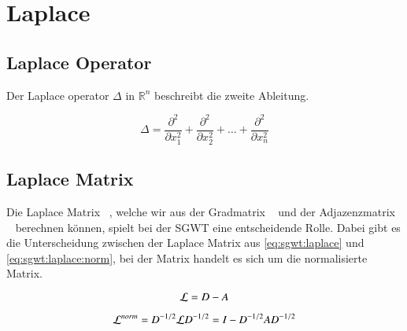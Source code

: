 
\section{Laplace\label{sec:sgwt:laplace}}

\subsection{Laplace Operator\label{subsec:sgwt:laplaceop}}

Der Laplace operator $\Delta$ in $\mathbb{R}^n$ beschreibt die zweite Ableitung.

\begin{equation}
\Delta = \frac{\partial^2}{\partial x_1^2}
+ \frac{\partial^2}{\partial x_2^2}
+ \dots
+ \frac{\partial^2}{\partial x_n^2}
\end{equation}

\subsection{Laplace Matrix\label{subsec:sgwt:laplacm}}


Die Laplace Matrix 
\laplaceL~\cite{noauthor_laplace-matrix_2017}, welche wir aus der 
Gradmatrix \degreeM~\cite{noauthor_degree_2018} und der Adjazenzmatrix 
\adjacencyM~\cite{noauthor_adjacency_2019} berechnen k\"onnen, spielt bei der 
SGWT eine entscheidende Rolle. Dabei gibt es 
die Unterscheidung zwischen der Laplace Matrix aus \cref{eq:sgwt:laplace} und 
\cref{eq:sgwt:laplace:norm}, bei der \laplaceLnorm{} Matrix handelt es sich um 
die normalisierte \laplaceL{} Matrix.

\begin{equation}
\laplaceL = \degreeM - \adjacencyM
\label{eq:sgwt:laplace}
\end{equation}

\begin{equation}
\laplaceLnorm
= \degreeM^{-1/2}\laplaceL\degreeM^{-1/2}
= I - \degreeM^{-1/2}\adjacencyM\degreeM^{-1/2}
\label{eq:sgwt:laplace:norm}
\end{equation}

